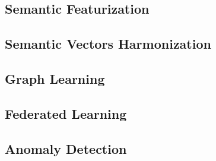 \subsection{Semantic Featurization}

\subsection{Semantic Vectors Harmonization}
\subsection{Graph Learning}
\subsection{Federated Learning}
\subsection{Anomaly Detection}


